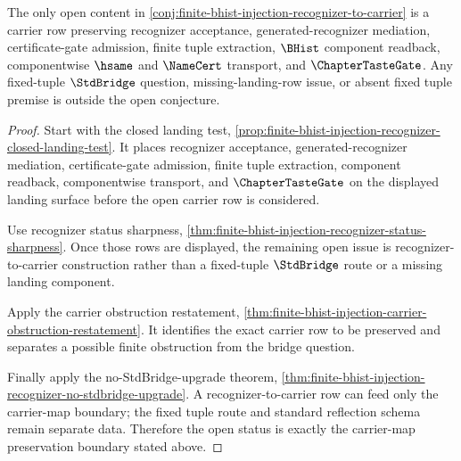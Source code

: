 \begin{theorem}
\label{thm:finite-bhist-injection-recognizer-closed-status}
The only open content in \autoref{conj:finite-bhist-injection-recognizer-to-carrier} is a carrier row preserving recognizer acceptance, generated-recognizer mediation, certificate-gate admission, finite tuple extraction, $\BHist$ component readback, componentwise $\hsame$ and $\NameCert$ transport, and $\ChapterTasteGate$. Any fixed-tuple $\StdBridge$ question, missing-landing-row issue, or absent fixed tuple premise is outside the open conjecture.
\end{theorem}
\begin{proof}
Start with the closed landing test, \autoref{prop:finite-bhist-injection-recognizer-closed-landing-test}. It places recognizer acceptance, generated-recognizer mediation, certificate-gate admission, finite tuple extraction, component readback, componentwise transport, and $\ChapterTasteGate$ on the displayed landing surface before the open carrier row is considered.

Use recognizer status sharpness, \autoref{thm:finite-bhist-injection-recognizer-status-sharpness}. Once those rows are displayed, the remaining open issue is recognizer-to-carrier construction rather than a fixed-tuple $\StdBridge$ route or a missing landing component.

Apply the carrier obstruction restatement, \autoref{thm:finite-bhist-injection-carrier-obstruction-restatement}. It identifies the exact carrier row to be preserved and separates a possible finite obstruction from the bridge question.

Finally apply the no-StdBridge-upgrade theorem, \autoref{thm:finite-bhist-injection-recognizer-no-stdbridge-upgrade}. A recognizer-to-carrier row can feed only the carrier-map boundary; the fixed tuple route and standard reflection schema remain separate data. Therefore the open status is exactly the carrier-map preservation boundary stated above.
\end{proof}


